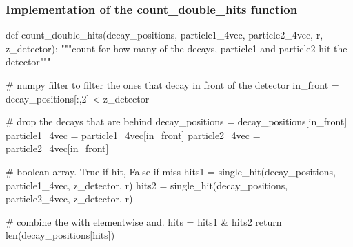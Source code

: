 \documentclass[12pt,a4paper,oneside,english]{article}
\begin{document}
\subsubsection{Implementation of the count\_double\_hits function}
\label{subsubse: double_hit_code}
\begin{shaded}
	\begin{python}
def count_double_hits(decay_positions, particle1_4vec, particle2_4vec, r, z_detector):
	"""count for how many of the decays, particle1 and particle2 hit the detector"""
	
	# numpy filter to filter the ones that decay in front of the detector
	in_front = decay_positions[:,2] < z_detector
	
	# drop the decays that are behind
	decay_positions = decay_positions[in_front]
	particle1_4vec = particle1_4vec[in_front]
	particle2_4vec = particle2_4vec[in_front]
	
	# boolean array. True if hit, False if miss
	hits1 = single_hit(decay_positions, particle1_4vec, z_detector, r)
	hits2 = single_hit(decay_positions, particle2_4vec, z_detector, r)
	
	# combine the with elementwise and.
	hits = hits1 & hits2
	return len(decay_positions[hits])

	\end{python}
\end{shaded}

	
\end{document}
